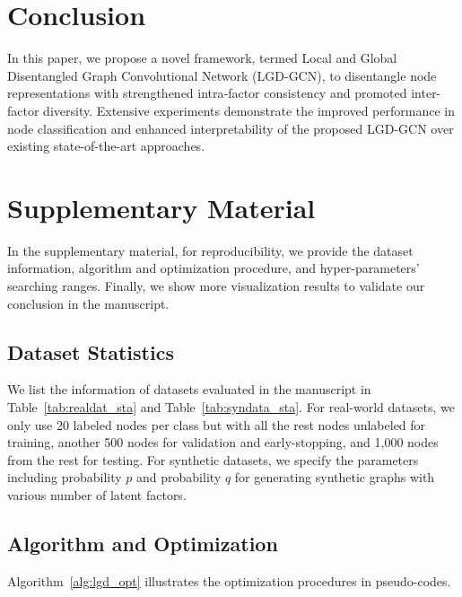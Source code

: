 \documentclass[accepted]{uai2021} %
\begin{document}
\section{Conclusion}
In this paper, we propose a novel framework, termed Local and Global Disentangled Graph Convolutional Network (LGD-GCN), to disentangle node representations with strengthened intra-factor consistency and promoted inter-factor diversity.
Extensive experiments demonstrate the improved performance in node classification and enhanced interpretability of the proposed LGD-GCN over existing state-of-the-art approaches.




\clearpage
\appendix
\section{Supplementary Material}
In the supplementary material, for reproducibility, we provide the dataset information, algorithm and optimization procedure, and hyper-parameters' searching ranges. Finally, we show more visualization results to validate our conclusion in the manuscript.

\subsection{Dataset Statistics}
We list the information of datasets evaluated in the manuscript in Table~\ref{tab:realdat_sta} and Table~\ref{tab:syndata_sta}. For real-world datasets, we only use 20 labeled nodes per class but with all the rest nodes unlabeled for training, another 500 nodes for validation and early-stopping, and 1,000 nodes from the rest for testing. For synthetic datasets, we specify the parameters including probability $p$ and probability $q$ for generating synthetic graphs with various number of latent factors.

\subsection{Algorithm and Optimization}
Algorithm~\ref{alg:lgd_opt} illustrates the optimization procedures in pseudo-codes.

\end{document}
